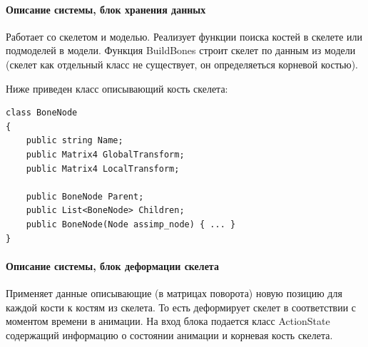 \paragraph{Описание системы, блок хранения данных}
Работает со скелетом и моделью.
Реализует функции поиска костей в скелете или подмоделей в модели.
Функция BuildBones строит скелет по данным из модели (скелет как отдельный класс не существует, он определяеться корневой костью).

Ниже приведен класс описывающий кость скелета:
\begin{verbatim}
class BoneNode
{
    public string Name;
    public Matrix4 GlobalTransform;
    public Matrix4 LocalTransform;

    public BoneNode Parent;
    public List<BoneNode> Children;
    public BoneNode(Node assimp_node) { ... }
}
\end{verbatim}


\paragraph{Описание системы, блок деформации скелета}
Применяет данные описывающие (в матрицах поворота) новую позицию для каждой кости к костям из скелета.
То есть деформирует скелет в соответствии с моментом времени в анимации. На вход блока подается класс ActionState содержащий информацию о состоянии анимации и корневая кость скелета.

